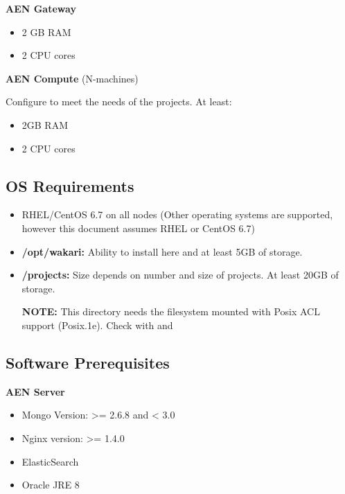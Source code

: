 \documentclass[letterpaper,10pt,openany,oneside]{sphinxmanual}
\begin{document}
\textbf{AEN Gateway}
\begin{itemize}
\item {} 
2 GB RAM

\item {} 
2 CPU cores

\end{itemize}

\textbf{AEN Compute} (N-machines)

Configure to meet the needs of the projects. At least:
\begin{itemize}
\item {} 
2GB RAM

\item {} 
2 CPU cores

\end{itemize}


\subsection{OS Requirements}
\label{AnacondaEnterpriseNotebooks:os-requirements}\begin{itemize}
\item {} 
RHEL/CentOS 6.7 on all nodes (Other operating systems are supported,
however this document assumes RHEL or CentOS 6.7)

\item {} 
\textbf{/opt/wakari:} Ability to install here and at least 5GB of storage.

\item {} 
\textbf{/projects:} Size depends on number and size of projects. At least
20GB of storage.

\textbf{NOTE:} This directory needs the filesystem mounted with Posix ACL
support (Posix.1e). Check with  and

\end{itemize}


\subsection{Software Prerequisites}
\label{AnacondaEnterpriseNotebooks:software-prerequisites}
\textbf{AEN Server}
\begin{itemize}
\item {} 
Mongo Version: \textgreater{}= 2.6.8 and \textless{} 3.0

\item {} 
Nginx version: \textgreater{}= 1.4.0

\item {} 
ElasticSearch

\item {} 
Oracle JRE 8

\end{itemize}
\end{document}
